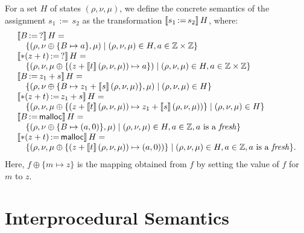 For a set $H$ of states $(\rho,\nu,\mu)$, we define the concrete semantics of the assignment
$s_1\,{:=}\,s_2$ as the transformation
$\llbracket s_1\,{:=}\,s_2\rrbracket\,H$, where:
\[
    \begin{array}{l}
        \llbracket B\,{:=}\,?\rrbracket\,H =
        \\
        \quad \{(\rho,\nu\oplus\{B\mapsto a\},\mu)\mid(\rho,\nu,\mu)\in H,a\in\mathbb{Z} \times \mathbb{Z}\}                   \\
        \llbracket*(z+t)\,{:=}\,?\rrbracket\,H =                                                                    \\
        \quad \{(\rho,\nu,\mu\oplus\{(z+\llbracket t\rrbracket\,(\rho,\nu,\mu))\mapsto a\})
        \mid(\rho,\nu,\mu)\in H,a\in\mathbb{Z} \times \mathbb{Z}\}                                                             \\
        \llbracket B\,{:=}\,z_1+s\rrbracket\,H =                                                                     \\
        \quad \{(\rho,\nu\oplus\{B\mapsto z_1+\llbracket s\rrbracket\,(\rho,\nu,\mu)\},\mu)\mid(\rho,\nu,\mu)\in H\} \\
        \llbracket*(z+t)\,{:=}\,z_1+s\rrbracket\,H =                                                                \\
        \quad \{(\rho,\nu,\mu\oplus\{(z+\llbracket t\rrbracket\,(\rho,\nu,\mu))\mapsto z_1+\llbracket s\rrbracket\,(\rho,\nu,\mu))\}
        \mid(\rho,\nu,\mu)\in H\}                                                                     \\
        \llbracket B\,{:=}\,\textsf{malloc}\rrbracket\,H =                                                                   \\
        \quad \{(\rho,\nu\oplus\{B\mapsto (a,0)\},\mu)\mid
        (\rho,\nu,\mu)\in H, a\in \mathbb{Z},
        a \text{ is a \emph{fresh}}\}                                                                 \\
        \llbracket*(z+t)\,{:=}\,\textsf{malloc}\rrbracket\,H =
        \\
        \quad\{(\rho,\nu,\mu\oplus\{(z+\llbracket t\rrbracket\,(\rho,\nu,\mu))\mapsto (a,0))\}\mid
        (\rho,\nu,\mu)\in H, a\in \mathbb{Z}, a \text{ is a \emph{fresh}}\}.
    \end{array}
\]
Here,
$f\oplus\{m\mapsto z\}$ is the mapping obtained
from $f$ by
setting the value of $f$ for $m$ to $z$.

\section{Interprocedural Semantics}

